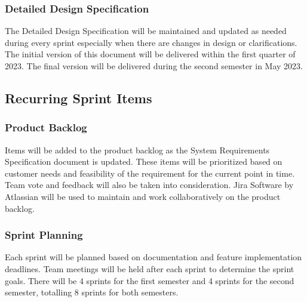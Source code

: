 
\subsubsection{Detailed Design Specification}
The Detailed Design Specification will be maintained and updated as needed during every sprint especially when there are changes in design or clarifications. The initial version of this document will be delivered within the first quarter of 2023. The final version will be delivered during the second semester in May 2023.


\subsection{Recurring Sprint Items}
\subsubsection{Product Backlog}
Items will be added to the product backlog as the System Requirements Specification document is updated. These items will be prioritized based on customer needs and feasibility of the requirement for the current point in time. Team vote and feedback will also be taken into consideration. Jira Software by Atlassian will be used to maintain and work collaboratively on the product backlog.


\subsubsection{Sprint Planning}
Each sprint will be planned based on documentation and feature implementation deadlines. Team meetings will be held after each sprint to determine the sprint goals. There will be 4 sprints for the first semester and 4 sprints for the second semester, totalling 8 sprints for both semesters.

